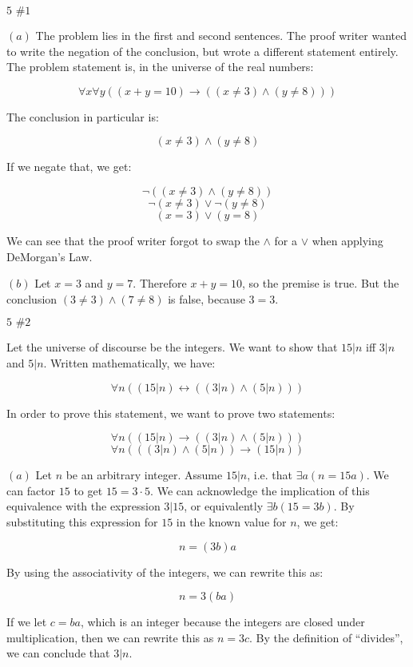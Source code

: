 \documentclass{article}
\newcommand{\problem}[2]{$\boxed{\text{#1 \##2}}$}
\newcommand{\subproblem}[1]{$\boxed{(#1)}$}
\begin{document}
\begin{multicols*}{2}

\problem{5}{1}

\subproblem{a} The problem lies in the first and second sentences. The
proof writer wanted to write the negation of the conclusion, but wrote
a different statement entirely. The problem statement is, in the
universe of the real numbers:

\[
\forall x\forall y((x+y=10)\rightarrow((x\ne 3)\wedge(y\ne 8)))
\]

The conclusion in particular is:

\[
(x\ne 3)\wedge(y\ne 8)
\]

If we negate that, we get:

\[
\neg((x\ne 3)\wedge(y\ne 8))
\] \[
\neg(x\ne 3)\vee\neg(y\ne 8)
\] \[
(x=3)\vee(y=8)
\]

We can see that the proof writer forgot to swap the $\wedge$ for a
$\vee$ when applying DeMorgan's Law.

\subproblem{b} Let $x=3$ and $y=7$. Therefore $x+y=10$, so the premise
is true. But the conclusion $(3\ne 3)\wedge(7\ne 8)$ is false, because
$3=3$.

\problem{5}{2}

Let the universe of discourse be the integers. We want to show that
$15|n$ iff $3|n$ and $5|n$. Written mathematically, we have:

\[
\forall n((15|n)\leftrightarrow((3|n)\wedge(5|n)))
\]

In order to prove this statement, we want to prove two statements:

\[\tag{a}
\forall n((15|n)\rightarrow((3|n)\wedge(5|n)))
\] \[\tag{b}
\forall n(((3|n)\wedge(5|n))\rightarrow(15|n))
\]

\subproblem{a} Let $n$ be an arbitrary integer. Assume $15|n$,
i.e. that $\exists{}a(n=15a)$. We can factor $15$ to get
$15=3\cdot{}5$. We can acknowledge the implication of this equivalence
with the expression $3|15$, or equivalently $\exists{}b(15=3b)$. By
substituting this expression for $15$ in the known value for $n$, we
get:

\[
n=(3b)a
\]

By using the associativity of the integers, we can rewrite this as:

\[
n=3(ba)
\]

If we let $c=ba$, which is an integer because the integers are closed
under multiplication, then we can rewrite this as $n=3c$. By the
definition of ``divides'', we can conclude that $3|n$.


\end{multicols*}
\end{document}
